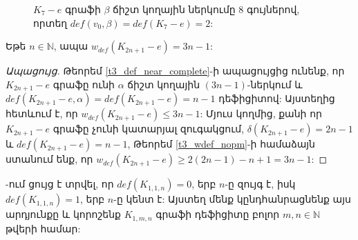 \begin{figure}
\begin{center}
  \end{center}
  \caption{$K_7-e$ գրաֆի $\beta$ ճիշտ կողային ներկումը $8$ գույներով, որտեղ $def( v_0,\beta)=def(K_7-e)=2$:}
  \label{K7-minus-edge}
\end{figure}

\begin{theorem}
\label{t3_wdef_near_complete} Եթե $n\in \mathbb{N}$, ապա
$w_{def}(K_{2n+1}-e)=3n-1$:
\end{theorem}
\begin{proof}[Ապացույց]
Թեորեմ \ref{t3_def_near_complete}-ի ապացույցից ունենք, որ
$K_{2n+1}-e$ գրաֆը ունի $\alpha$ ճիշտ կողային $(3n-1)$-ներկում և $def(K_{2n+1}-e,\alpha)=def(K_{2n+1}-e)=n-1$ դեֆիցիտով: Այստեղից հետևում է, որ $w_{def}(K_{2n+1}-e)\leq 3n-1$: Մյուս կողմից, քանի որ $K_{2n+1}-e$ գրաֆը չունի կատարյալ զուգակցում, $\delta(K_{2n+1}-e)=2n-1$ և $def(K_{2n+1}-e)=n-1$, Թեորեմ
\ref{t3_wdef_nopm}-ի համաձայն ստանում ենք, որ $w_{def}(K_{2n+1}-e)\geq
2(2n-1)-n+1=3n-1$:
\end{proof}

\cite{FengHuang2007}-ում ցույց է տրվել, որ $def\left(K_{1,1,n}\right)=0$, երբ $n$-ը զույգ է, իսկ $def\left(K_{1,1,n}\right)=1$, երբ $n$-ը կենտ է:
Այստեղ մենք կընդհանրացնենք այս արդյունքը և կորոշենք $K_{1,m,n}$ գրաֆի դեֆիցիտը բոլոր $m,n\in \mathbb{N}$ թվերի համար:

